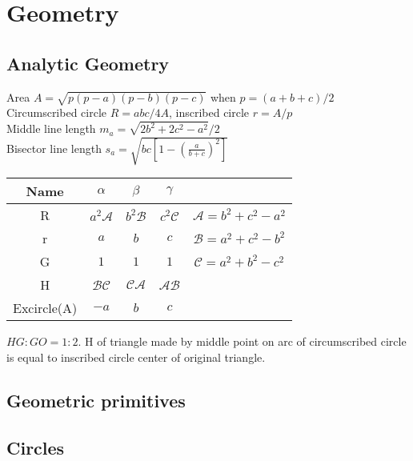 \chapter{Geometry}

\section{Analytic Geometry}
Area $A = \sqrt{p(p-a)(p-b)(p-c)}$ when $p = (a+b+c)/2$ \\
Circumscribed circle $R = abc/4A$, inscribed circle $r = A/p$ \\ 
Middle line length $m_a = \sqrt{2b^2+2c^2-a^2}/2$ \\
Bisector line length $s_a=\sqrt{bc[1-(\frac{a}{b+c})^2]}$ \\
\begin{tabular}{|c|c|c|c|c|}
    Name & $\alpha$ & $\beta$ & $\gamma$ & \\ \hline
    R & $a^2\mathcal{A}$ & $b^2\mathcal{B}$ & $c^2\mathcal{C}$ & $\mathcal{A}=b^2+c^2-a^2$ \\
    r & $a$ & $b$ & $c$ & $\mathcal{B} = a^2 + c^2 - b^2$ \\
    G & $1$ & $1$ & $1$ & $\mathcal{C} = a^2 + b^2 - c^2$ \\
    H & $\mathcal{BC}$ & $\mathcal{CA}$ & $\mathcal{AB}$ & \\
    Excircle(A) & $-a$ & $b$ & $c$ & 
\end{tabular}
$HG:GO=1:2$. H of triangle made by middle point on arc of circumscribed circle is equal to inscribed circle center of original triangle. \\

\section{Geometric primitives}

\section{Circles}

